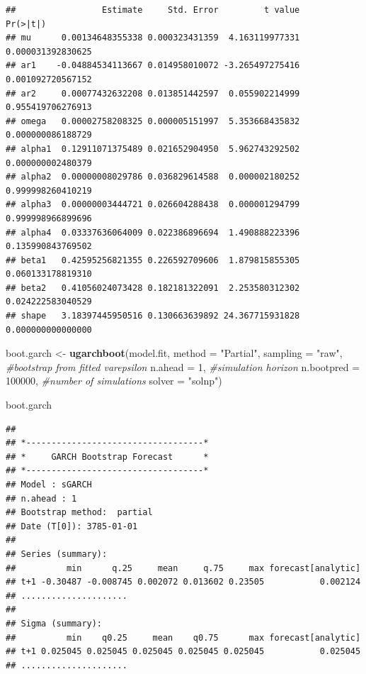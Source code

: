\documentclass[
]{book}
\newenvironment{Shaded}{\begin{snugshade}}{\end{snugshade}}
\newcommand{\AttributeTok}[1]{\textcolor[rgb]{0.13,0.29,0.53}{#1}}
\newcommand{\CommentTok}[1]{\textcolor[rgb]{0.56,0.35,0.01}{\textit{#1}}}
\newcommand{\DecValTok}[1]{\textcolor[rgb]{0.00,0.00,0.81}{#1}}
\newcommand{\FunctionTok}[1]{\textcolor[rgb]{0.13,0.29,0.53}{\textbf{#1}}}
\newcommand{\NormalTok}[1]{#1}
\newcommand{\OtherTok}[1]{\textcolor[rgb]{0.56,0.35,0.01}{#1}}
\newcommand{\StringTok}[1]{\textcolor[rgb]{0.31,0.60,0.02}{#1}}
\begin{document}
\begin{verbatim}
##                 Estimate     Std. Error         t value          Pr(>|t|)
## mu      0.00134648355338 0.000323431359  4.163119977331 0.000031392830625
## ar1    -0.04884534113667 0.014958010072 -3.265497275416 0.001092720567152
## ar2     0.00077432632208 0.013851442597  0.055902214999 0.955419706276913
## omega   0.00002758208325 0.000005151997  5.353668435832 0.000000086188729
## alpha1  0.12911071375489 0.021652904950  5.962743292502 0.000000002480379
## alpha2  0.00000008029786 0.036829614588  0.000002180252 0.999998260410219
## alpha3  0.00000003444721 0.026604288438  0.000001294799 0.999998966899696
## alpha4  0.03337636064009 0.022386896694  1.490888223396 0.135990843769502
## beta1   0.42595256821355 0.226592709606  1.879815855305 0.060133178819310
## beta2   0.41056024073428 0.182181322091  2.253580312302 0.024222583040529
## shape   3.18397445950516 0.130663639892 24.367715931828 0.000000000000000
\end{verbatim}

\begin{Shaded}
\begin{Highlighting}[]
\NormalTok{boot.garch }\OtherTok{\textless{}{-}} \FunctionTok{ugarchboot}\NormalTok{(model.fit,}
                         \AttributeTok{method =} \StringTok{"Partial"}\NormalTok{,}
                         \AttributeTok{sampling =} \StringTok{"raw"}\NormalTok{,  }\CommentTok{\#bootstrap from fitted varepsilon}
                         \AttributeTok{n.ahead =} \DecValTok{1}\NormalTok{,          }\CommentTok{\#simulation horizon}
                         \AttributeTok{n.bootpred =} \DecValTok{100000}\NormalTok{, }\CommentTok{\#number of simulations }
                         \AttributeTok{solver =} \StringTok{"solnp"}\NormalTok{)}

\NormalTok{boot.garch}
\end{Highlighting}
\end{Shaded}

\begin{verbatim}
## 
## *-----------------------------------*
## *     GARCH Bootstrap Forecast      *
## *-----------------------------------*
## Model : sGARCH
## n.ahead : 1
## Bootstrap method:  partial
## Date (T[0]): 3785-01-01
## 
## Series (summary):
##          min      q.25     mean     q.75     max forecast[analytic]
## t+1 -0.30487 -0.008745 0.002072 0.013602 0.23505           0.002124
## .....................
## 
## Sigma (summary):
##          min    q0.25     mean    q0.75      max forecast[analytic]
## t+1 0.025045 0.025045 0.025045 0.025045 0.025045           0.025045
## .....................
\end{verbatim}
\end{document}
